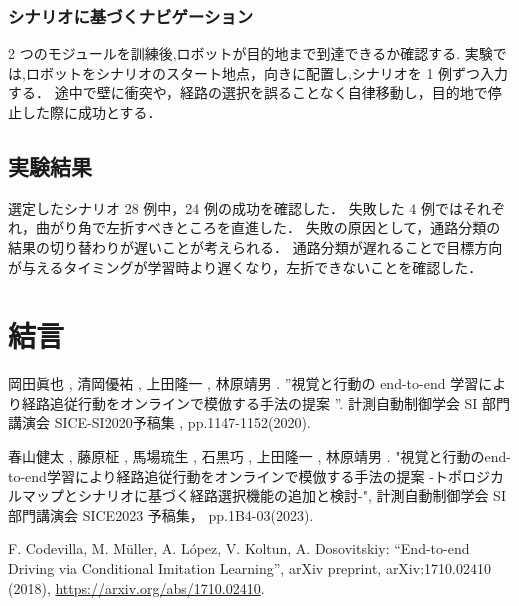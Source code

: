 \documentclass[10pt]{jarticle}
\begin{document}
    \subsubsection{シナリオに基づくナビゲーション}
    2 つのモジュールを訓練後,ロボットが目的地まで到達できるか確認する.
    実験では,ロボットをシナリオのスタート地点，向きに配置し,シナリオを 1 例ずつ入力する．
    途中で壁に衝突や，経路の選択を誤ることなく自律移動し，目的地で停止した際に成功とする．

    \subsection{実験結果}
    選定したシナリオ 28 例中，24 例の成功を確認した．
    失敗した 4 例ではそれぞれ，曲がり角で左折すべきところを直進した．
    失敗の原因として，通路分類の結果の切り替わりが遅いことが考えられる．
    通路分類が遅れることで目標方向が与えるタイミングが学習時より遅くなり，左折できないことを確認した．

    \section{結\hspace{2zw}言}%
    
    \vspace{5truemm}
    {\footnotesize
        \begin{thebibliography}{99}
            
            岡田眞也 , 清岡優祐 , 上田隆一 , 林原靖男 .
            ”視覚と行動の end-to-end 学習により経路追従行動をオンラインで模倣する手法の提案 ”. 
            計測自動制御学会 SI 部門講演会 SICE-SI2020予稿集 , 
            pp.1147-1152(2020).

            春山健太 , 藤原柾 , 馬場琉生 , 石黒巧 , 上田隆一 , 林原靖男 .
            "視覚と行動のend-to-end学習により経路追従行動をオンラインで模倣する手法の提案 -トポロジカルマップとシナリオに基づく経路選択機能の追加と検討-", 
            計測自動制御学会 SI 部門講演会 SICE2023 予稿集，
            pp.1B4-03(2023).
       
            F. Codevilla, M. Müller, A. López, V. Koltun, A. Dosovitskiy: 
            ``End-to-end Driving via Conditional Imitation Learning'', 
            arXiv preprint, arXiv:1710.02410 (2018), 
            \url{https://arxiv.org/abs/1710.02410}.

        \end{thebibliography}
    }
    \normalsize
    
\end{document}
